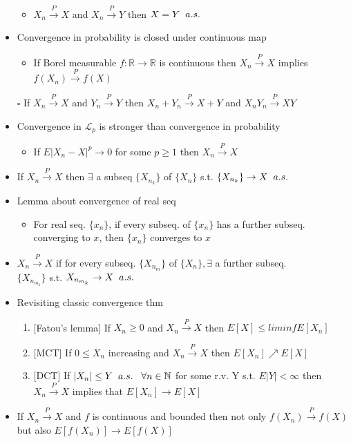 \documentclass[12pt, A4]{article}
\begin{document}
\begin{itemize}
\begin{itemize}
		\item $X_n \xrightarrow{P} X$ and $X_n \xrightarrow{P} Y$ then $X=Y \hspace{0.2cm} a.s.$ 
	\end{itemize} 
	\item Convergence in probability is closed under continuous map
	\begin{itemize}
		\item If Borel measurable $f : \mathbb{R}\rightarrow \mathbb{R}$ is continuous then $X_n \xrightarrow{P} X$ implies $f(X_n)\xrightarrow{P} f(X)$ 
	\end{itemize}
	\item[$\square$] If $X_n\xrightarrow{P} X$ and $Y_n\xrightarrow{P} Y$ then $X_n+Y_n\xrightarrow{P} X+Y$ and $X_nY_n\xrightarrow{P} XY$
	\item Convergence in $\mathcal{L}_p$ is stronger than convergence in probability
	\begin{itemize}
		\item If $E|X_n-X|^p\rightarrow 0$ for some $p\geq 1$ then $X_n\xrightarrow{P}X$
	\end{itemize}
	\item If $X_n\xrightarrow{P} X$ then $\exists$ a subseq $\{X_{n_k}\}$ of $\{X_n\}$ s.t. $\{X_{n_k}\}\rightarrow X \hspace{0.2cm} a.s.$
	\item Lemma about convergence of real seq
	\begin{itemize}
		\item For real seq. $\{x_n\}$,  if every subseq. of $\{x_n\}$ has a further subseq. converging to $x$, then $\{x_n\}$ converges to $x$
	\end{itemize}
	\item $X_n\xrightarrow{P} X$ if for every subseq. $\{X_{n_m}\}$ of $\{X_n\}, \exists$ a further subseq. \\ $\{X_{n_{m_k}}\}$ s.t. $X_{n_{m_k}}\rightarrow X \hspace{0.2cm} a.s.$	
	\item Revisiting classic convergence thm
	\begin{enumerate}
		\item {[Fatou's lemma]} If $X_n \geq 0$ and $X_n \xrightarrow{P} X$ then $E[X]\leq liminfE[X_n]$
		\item {[MCT]} If $0\leq X_n$ increasing and $X_n\xrightarrow{P}X$ then $E[X_n]\nearrow E[X]$
		\item {[DCT]} If $|X_n|\leq Y \hspace{0.2cm} a.s.\hspace{0.3cm} \forall n\in \mathbb{N}$ for some r.v. Y s.t. $E|Y|<\infty$ then $X_n\xrightarrow{P} X$ implies that $E[X_n]\rightarrow E[X]$
	\end{enumerate}
	\item If $X_n\xrightarrow{P} X$ and $f$ is continuous and bounded \newline then not only $f(X_n)\xrightarrow{P}f(X)$ but also $E[f(X_n)]\rightarrow E[f(X)]$
\end{itemize}
\end{document}
